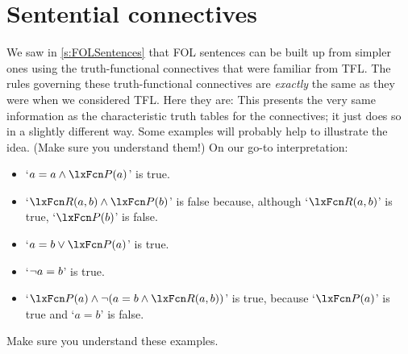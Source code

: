 \section{Sentential connectives}
We saw in \cref{s:FOLSentences} that FOL sentences can be built up from simpler ones using the truth-functional connectives that were familiar from TFL. The rules governing these truth-functional connectives are \emph{exactly} the same as they were when we considered TFL. Here they are:
This presents the very same information as the characteristic truth tables for the connectives; it just does so in a slightly different way. Some examples will probably help to illustrate the idea. (Make sure you understand them!) On our go-to interpretation:
	\begin{itemize}
		\item `$a = a \eand \atom{P}{a}$' is true.
		\item `$\atom{R}{a,b} \eand \atom{P}{b}$' is false because, although `$\atom{R}{a,b}$' is true, `$\atom{P}{b}$' is false.
		\item `$a = b \eor \atom{P}{a}$' is true.
		\item `$\neg a = b$' is true.
		\item `$\atom{P}{a} \eand \enot( a= b \eand \atom{R}{a,b})$' is true, because `$\atom{P}{a}$' is true and `$a = b$' is false.
	\end{itemize}
Make sure you understand these examples.

